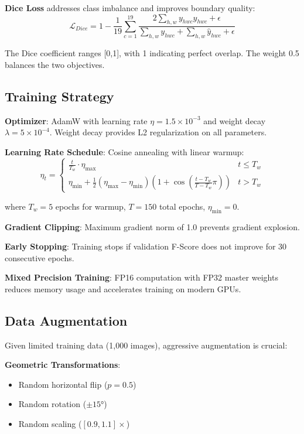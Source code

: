 \textbf{Dice Loss} addresses class imbalance and improves boundary quality:
\begin{equation}
\mathcal{L}_{Dice} = 1 - \frac{1}{19}\sum_{c=1}^{19}\frac{2\sum_{h,w}y_{hwc}\hat{y}_{hwc} + \epsilon}{\sum_{h,w}y_{hwc} + \sum_{h,w}\hat{y}_{hwc} + \epsilon}
\end{equation}

The Dice coefficient ranges [0,1], with 1 indicating perfect overlap. The weight 0.5 balances the two objectives.

\subsection{Training Strategy}

\textbf{Optimizer}: AdamW with learning rate $\eta = 1.5 \times 10^{-3}$ and weight decay $\lambda = 5 \times 10^{-4}$. Weight decay provides L2 regularization on all parameters.

\textbf{Learning Rate Schedule}: Cosine annealing with linear warmup:
\begin{equation}
\eta_t = \begin{cases}
\frac{t}{T_w} \cdot \eta_{\max} & t \leq T_w \\
\eta_{\min} + \frac{1}{2}(\eta_{\max} - \eta_{\min})(1 + \cos(\frac{t-T_w}{T-T_w}\pi)) & t > T_w
\end{cases}
\end{equation}

where $T_w = 5$ epochs for warmup, $T = 150$ total epochs, $\eta_{\min} = 0$.

\textbf{Gradient Clipping}: Maximum gradient norm of 1.0 prevents gradient explosion.

\textbf{Early Stopping}: Training stops if validation F-Score does not improve for 30 consecutive epochs.

\textbf{Mixed Precision Training}: FP16 computation with FP32 master weights reduces memory usage and accelerates training on modern GPUs.

\subsection{Data Augmentation}

Given limited training data (1,000 images), aggressive augmentation is crucial:

\textbf{Geometric Transformations}:
\begin{itemize}
    \item Random horizontal flip ($p = 0.5$)
    \item Random rotation ($\pm 15°$)
    \item Random scaling ($[0.9, 1.1]\times$)
\end{itemize}

